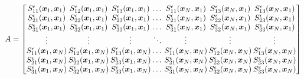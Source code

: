 \begin{equation*}
A = 
\begingroup
\setlength\arraycolsep{1pt}
\begin{bmatrix}
S^{\epsilon}_{11}(\bm{x}_1,{\bm{x}}_1) & S^{\epsilon}_{12}(\bm{x}_1,{\bm{x}}_1) & S^{\epsilon}_{13}(\bm{x}_1,{\bm{x}}_1) & \dots & S^{\epsilon}_{11}(\bm{x}_N,{\bm{x}}_1) & S^{\epsilon}_{13}(\bm{x}_N,{\bm{x}}_1) & S^{\epsilon}_{13}(\bm{x}_N,{\bm{x}}_1)\\
S^{\epsilon}_{21}(\bm{x}_1,{\bm{x}}_1) & S^{\epsilon}_{22}(\bm{x}_1,{\bm{x}}_1) & S^{\epsilon}_{23}(\bm{x}_1,{\bm{x}}_1) & \dots & S^{\epsilon}_{21}(\bm{x}_N,{\bm{x}}_1) & S^{\epsilon}_{22}(\bm{x}_N,{\bm{x}}_1) & S^{\epsilon}_{23}(\bm{x}_N,{\bm{x}}_1)\\
S^{\epsilon}_{31}(\bm{x}_1,{\bm{x}}_1) & S^{\epsilon}_{32}(\bm{x}_1,{\bm{x}}_1) & S^{\epsilon}_{33}(\bm{x}_1,{\bm{x}}_1) & \dots & S^{\epsilon}_{31}(\bm{x}_N,{\bm{x}}_1) & S^{\epsilon}_{32}(\bm{x}_N,{\bm{x}}_1) & S^{\epsilon}_{33}(\bm{x}_N,{\bm{x}}_1)\\
\vdots & \vdots & \vdots & \ddots & \vdots & \vdots & \vdots \\
S^{\epsilon}_{11}(\bm{x}_1,{\bm{x}}_N) & S^{\epsilon}_{12}(\bm{x}_1,{\bm{x}}_N) & S^{\epsilon}_{13}(\bm{x}_1,{\bm{x}}_N) & \dots & S^{\epsilon}_{11}(\bm{x}_N,{\bm{x}}_N) & S^{\epsilon}_{12}(\bm{x}_N,{\bm{x}}_N) & S^{\epsilon}_{13}(\bm{x}_N,{\bm{x}}_N)  \\
S^{\epsilon}_{21}(\bm{x}_1,{\bm{x}}_N) & S^{\epsilon}_{22}(\bm{x}_1,{\bm{x}}_N) & S^{\epsilon}_{23}(\bm{x}_1,{\bm{x}}_N) & \dots & S^{\epsilon}_{21}(\bm{x}_N,{\bm{x}}_N) & S^{\epsilon}_{22}(\bm{x}_N,{\bm{x}}_N) & S^{\epsilon}_{23}(\bm{x}_N,{\bm{x}}_N) \\
S^{\epsilon}_{31}(\bm{x}_1,{\bm{x}}_N) & S^{\epsilon}_{32}(\bm{x}_1,{\bm{x}}_N) & S^{\epsilon}_{33}(\bm{x}_1,{\bm{x}}_N) & \dots & S^{\epsilon}_{31}(\bm{x}_N,{\bm{x}}_N) & S^{\epsilon}_{32}(\bm{x}_N,{\bm{x}}_N) & S^{\epsilon}_{33}(\bm{x}_N,{\bm{x}}_N) \\
\end{bmatrix}
\endgroup
\end{equation*}
\normalsize
